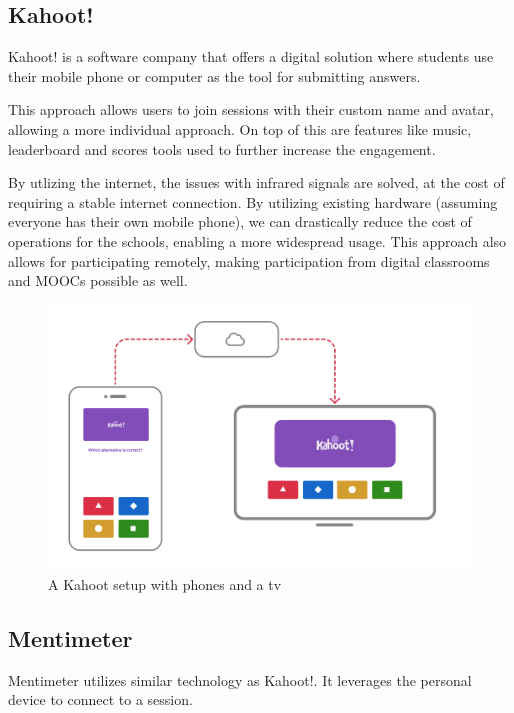 \subsection{Kahoot!}
Kahoot! is a software company that offers a digital solution where students use their mobile phone or computer as the tool for submitting answers.

This approach allows users to join sessions with their custom name and avatar, allowing a more individual approach. On top of this are features like music, leaderboard and scores tools used to further increase the engagement.

By utlizing the internet, the issues with infrared signals are solved, at the cost of requiring a stable internet connection. By utilizing existing hardware (assuming everyone has their own mobile phone), we can drastically reduce the cost of operations for the schools, enabling a more widespread usage. This approach also allows for participating remotely, making participation from digital classrooms and MOOCs possible as well. 


\begin{figure}[h!]
    \centering
    \includegraphics[width=1\linewidth]{figures/kahoot-illustration.png}
    \caption{A Kahoot setup with phones and a tv}
    \label{fig:kahoot}
\end{figure}

\subsection{Mentimeter}
Mentimeter utilizes similar technology as Kahoot!. It leverages the personal device to connect to a session. 


